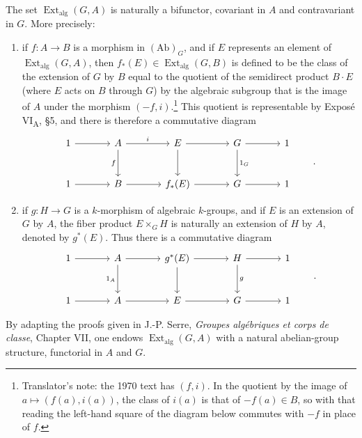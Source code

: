 The set \(\operatorname{Ext}_{\mathrm{alg}}(G,A)\) is naturally a
bifunctor, covariant in \(A\) and contravariant in \(G\).  More
precisely:
\begin{enumerate}
\item[(a)] 
  if \(f:A\to B\) is a morphism in \((\mathrm{Ab})_G\), and if
  \(E\) represents an element of
  \(\operatorname{Ext}_{\mathrm{alg}}(G,A)\), then
  \(f_*(E)\in\operatorname{Ext}_{\mathrm{alg}}(G,B)\) is defined
  to be the class of the extension of \(G\) by \(B\) equal to
  the quotient of the semidirect product \(B\mathbin{\cdot}E\)
  (where \(E\) acts on \(B\) through \(G\)) by the algebraic
  subgroup that is the image of \(A\) under the morphism
  \((-f,i)\).\footnote{Translator's note: the 1970 text has \((f,i)\).
  In the quotient by the image of \(a\mapsto(f(a),i(a))\), the class of
  \(i(a)\) is that of \(-f(a)\in B\), so with that reading the left-hand
  square of the diagram below commutes with \(-f\) in place of \(f\).}  This quotient is representable by Exposé VI\textsubscript{A},
  \S5, and there is therefore a commutative diagram
  \[
  \begin{tikzcd}[column sep=large,row sep=large]
    1 \arrow[r] &
    A \arrow[r,"i"] \arrow[d,"f"'] &
    E \arrow[r] \arrow[d] &
    G \arrow[r] \arrow[d,"1_G"] &
    1 \\
    1 \arrow[r] &
    B \arrow[r] &
    f_*(E) \arrow[r] &
    G \arrow[r] &
    1
  \end{tikzcd}
  \qquad .
  \]

\item[(b)] 
  if \(g:H\to G\) is a \(k\)-morphism of algebraic
  \(k\)-groups, and if \(E\) is an extension of \(G\) by \(A\),
  the fiber product \(E\times_G H\) is naturally an extension
  of \(H\) by \(A\), denoted by \(g^*(E)\).  Thus there is a
  commutative diagram
  \[
  \begin{tikzcd}[column sep=large,row sep=large]
    1 \arrow[r] &
    A \arrow[r] \arrow[d,"1_A"'] &
    g^*(E) \arrow[r] \arrow[d] &
    H \arrow[r] \arrow[d,"g"] &
    1 \\
    1 \arrow[r] &
    A \arrow[r] &
    E \arrow[r] &
    G \arrow[r] &
    1
  \end{tikzcd}
  \qquad .
  \]
\end{enumerate}

By adapting the proofs given in J.-P. Serre,
\emph{Groupes algébriques et corps de classe}, Chapter VII, one
endows \(\operatorname{Ext}_{\mathrm{alg}}(G,A)\) with a natural
abelian-group structure, functorial in \(A\) and \(G\).

